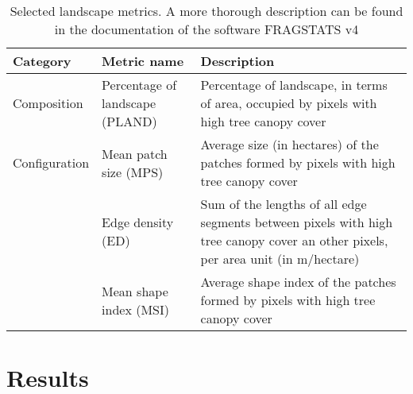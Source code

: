 \documentclass[10pt,letterpaper]{article}
\begin{document}
\begin{table}[!h]
  \footnotesize %
  \renewcommand{\arraystretch}{1.5} %
  \centering
  \begin{tabular}{p{} p{} p{}} 
    \toprule
    \textbf{Category} & \textbf{Metric name} & \textbf{Description} \\
    \midrule
    Composition & Percentage of landscape (PLAND) & Percentage of landscape, in terms of area, occupied by pixels with high tree canopy cover \\
    Configuration & Mean patch size (MPS) & Average size (in hectares) of the patches formed by pixels with high tree canopy cover \\
    & Edge density (ED) & Sum of the lengths of all edge segments between pixels with high tree canopy cover an other pixels, per area unit (in m/hectare) \\
    & Mean shape index (MSI) & Average shape index of the patches formed by pixels with high tree canopy cover \\
    \bottomrule  
  \end{tabular}
  \caption{\label{tab:selected-metrics}Selected landscape metrics. A more thorough description can be found in the documentation of the software FRAGSTATS v4 \cite{mcgarigal2012fragstats}}
\end{table}


\section*{Results}


\end{document}
